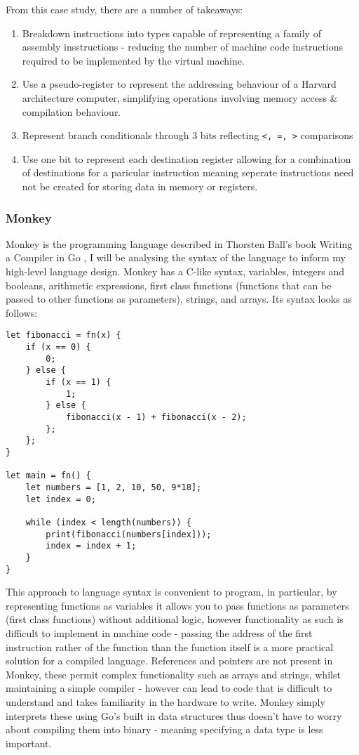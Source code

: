 From this case study, there are a number of takeaways:
\begin{enumerate}
    \item Breakdown instructions into types capable of representing a family of assembly insstructions - reducing the number of machine code instructions required to be implemented by the virtual machine.
    \item Use a pseudo-register to represent the addressing behaviour of a Harvard architecture computer, simplifying operations involving memory access \& compilation behaviour.
    \item Represent branch conditionals through 3 bits reflecting \texttt{<, =, >} comparisons  
    \item Use one bit to represent each destination register allowing for a combination of destinations for a paricular instruction meaning seperate instructions need not be created for storing data in memory or registers.
\end{enumerate}

\subsubsection{Monkey}
Monkey is the programming language described in Thorsten Ball's book Writing a Compiler in Go \textcite{Ball-WritingACompilerInGo}, I will be analysing the syntax of the language to inform my high-level language design. Monkey has a C-like syntax, variables, integers and booleans, arithmetic expressions, first class functions (functions that can be passed to other functions as parameters), strings, and arrays. Its syntax looks as follows:
\begin{lstlisting}
let fibonacci = fn(x) {
    if (x == 0) {
        0;
    } else {
        if (x == 1) {
            1;
        } else {
            fibonacci(x - 1) + fibonacci(x - 2);
        };
    };
}

let main = fn() {
    let numbers = [1, 2, 10, 50, 9*18];
    let index = 0;

    while (index < length(numbers)) {
        print(fibonacci(numbers[index]));
        index = index + 1;
    }
}
\end{lstlisting}

This approach to language syntax is convenient to program, in particular, by representing functions as variables it allows you to pass functions as parameters (first class functions) without additional logic, however functionality as such is difficult to implement in machine code - passing the address of the first instruction rather of the function than the function itself is a more practical solution for a compiled language. References and pointers are not present in Monkey, these permit complex functionality such as arrays and strings, whilst maintaining a simple compiler - however can lead to code that is difficult to understand and takes familiarity in the hardware to write. Monkey simply interprets these using Go's built in data structures thus doesn't have to worry about compiling them into binary - meaning specifying a data type is less important.


